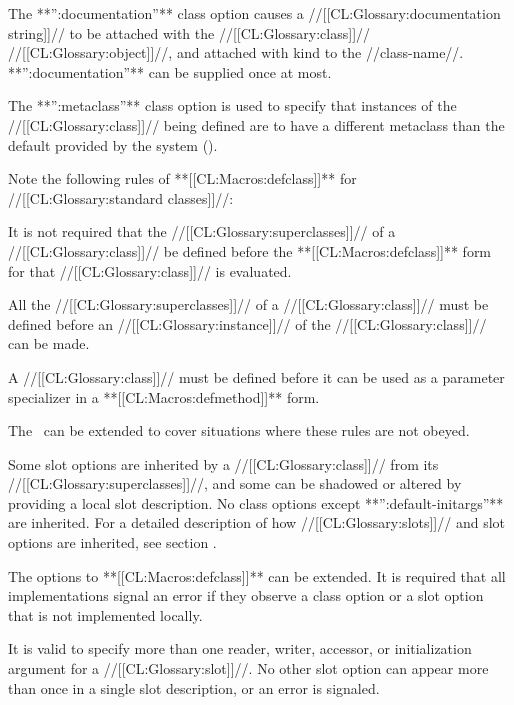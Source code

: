 \itemitem{\bull}

The **'':documentation''** class option causes a //[[CL:Glossary:documentation string]]// to be attached with the //[[CL:Glossary:class]]// //[[CL:Glossary:object]]//, and attached with kind  to the //class-name//. **'':documentation''** can be supplied once at most.


\itemitem{\bull} The **'':metaclass''** class option is used to specify that instances of the //[[CL:Glossary:class]]// being defined are to have a different metaclass than the default provided by the system ().

\endlist

Note the following rules of **[[CL:Macros:defclass]]** for //[[CL:Glossary:standard classes]]//:

\beginlist

\itemitem{\bull} It is not required that the //[[CL:Glossary:superclasses]]// of a //[[CL:Glossary:class]]// be defined before the **[[CL:Macros:defclass]]** form for that //[[CL:Glossary:class]]// is evaluated.

\itemitem{\bull} All the //[[CL:Glossary:superclasses]]// of a //[[CL:Glossary:class]]// must be defined before an //[[CL:Glossary:instance]]// of the //[[CL:Glossary:class]]// can be made.

\itemitem{\bull} A //[[CL:Glossary:class]]// must be defined before it can be used as a parameter specializer in a **[[CL:Macros:defmethod]]** form.

\endlist

The \OS\ can be extended to cover situations where these rules are not obeyed.

Some slot options are inherited by a //[[CL:Glossary:class]]// from its //[[CL:Glossary:superclasses]]//, and some can be shadowed or altered by providing a local slot description. No class options except **'':default-initargs''** are inherited. For a detailed description of how //[[CL:Glossary:slots]]// and slot options are inherited, see section {\secref\SlotInheritance}.

The options to **[[CL:Macros:defclass]]** can be extended. It is required that all implementations signal an error if they observe a class option or a slot option that is not implemented locally.

It is valid to specify more than one reader, writer, accessor, or initialization argument for a //[[CL:Glossary:slot]]//. No other slot option can appear more than once in a single slot description, or an error is signaled.

